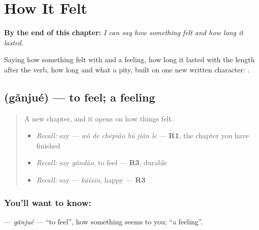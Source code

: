 
\chapter{How It Felt}
\label{ch:zh-how-it-felt}

\begin{chapteropening}
\textbf{By the end of this chapter:} \emph{I can say how something felt and how long it lasted.}

Saying how something felt with  and a feeling, how long it lasted with the length after the verb, how long and what a pity, built on one new written character: .
\end{chapteropening}

\section[\texorpdfstring{\zh{感觉} (gǎnjué)}{感觉 (gǎnjué)}]{ (gǎnjué) — to feel; a feeling}

\label{lesson:ZH-C286-ganjue}



\begin{quote}
A new chapter, and it opens on how things felt.

\begin{itemize}
\raggedright
  \item \emph{Recall:} say  — \emph{wǒ de chēpiào bú jiàn le} — \textbf{R1}, the chapter you have finished
  \item \emph{Recall:} say \emph{gǎndào}, to feel — \textbf{R3}, durable
  \item \emph{Recall:} say  — \emph{kāixīn}, happy — \textbf{R3}
\end{itemize}
\end{quote}

\subsection*{You'll want to know: }
\textbf{} — \emph{gǎnjué} — \textquotedblleft{}to feel\textquotedblright{}, how something seems to you; \textquotedblleft{}a feeling\textquotedblright{}.


